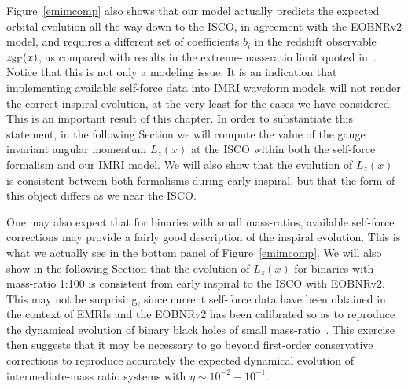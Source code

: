 Figure~\ref{emimcomp} also shows that our model actually predicts the expected orbital evolution all the way down to the ISCO, in agreement with the EOBNRv2 model, and requires a different set of coefficients  \(b_i\) in the redshift observable \(z_{\rm SF} (x)\), as compared with results in the extreme-mass-ratio limit quoted in~\cite{barus}. Notice that this is not only a modeling issue. It is an indication that implementing available self-force data into IMRI waveform models will not render the correct inspiral evolution, at the very  least for the cases we have considered. This is an important result of this chapter. In order to substantiate this statement, in the following Section we will compute the value of the gauge invariant angular momentum \(L_z(x)\) at the ISCO within both the self-force formalism and our IMRI model. We will also show that the evolution of \(L_z(x)\) is consistent between both formalisms during early inspiral, but that the form of this object differs as we near the ISCO.  

One may also expect that for binaries with small mass-ratios, available self-force corrections may provide a fairly good description of the inspiral evolution. This is what we actually see in the bottom panel of Figure~\ref{emimcomp}. We will also show in the following Section that the evolution of \(L_z(x)\) for binaries with mass-ratio 1:100 is consistent from early inspiral to the ISCO with EOBNRv2. This may not be surprising, since current self-force data have been obtained in the context of EMRIs and the EOBNRv2 has been calibrated so as to reproduce the dynamical evolution of binary black holes of small mass-ratio~\cite{resu,raci,nic,nic1}. This exercise then suggests that it may be necessary to go beyond first-order conservative corrections to reproduce accurately the expected dynamical evolution of intermediate-mass ratio systems with \(\eta \sim 10^{-2}-10^{-1}\).



